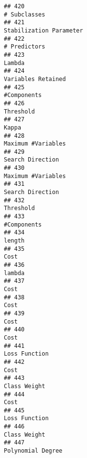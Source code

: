 \documentclass[
]{article}
\begin{document}
\begin{verbatim}
## 420                                                                            # Subclasses
## 421                                                                 Stabilization Parameter
## 422                                                                            # Predictors
## 423                                                                                  Lambda
## 424                                                                      Variables Retained
## 425                                                                             #Components
## 426                                                                               Threshold
## 427                                                                                   Kappa
## 428                                                                      Maximum #Variables
## 429                                                                        Search Direction
## 430                                                                      Maximum #Variables
## 431                                                                        Search Direction
## 432                                                                               Threshold
## 433                                                                             #Components
## 434                                                                                  length
## 435                                                                                    Cost
## 436                                                                                  lambda
## 437                                                                                    Cost
## 438                                                                                    Cost
## 439                                                                                    Cost
## 440                                                                                    Cost
## 441                                                                           Loss Function
## 442                                                                                    Cost
## 443                                                                            Class Weight
## 444                                                                                    Cost
## 445                                                                           Loss Function
## 446                                                                            Class Weight
## 447                                                                       Polynomial Degree

\end{verbatim}
\end{document}
